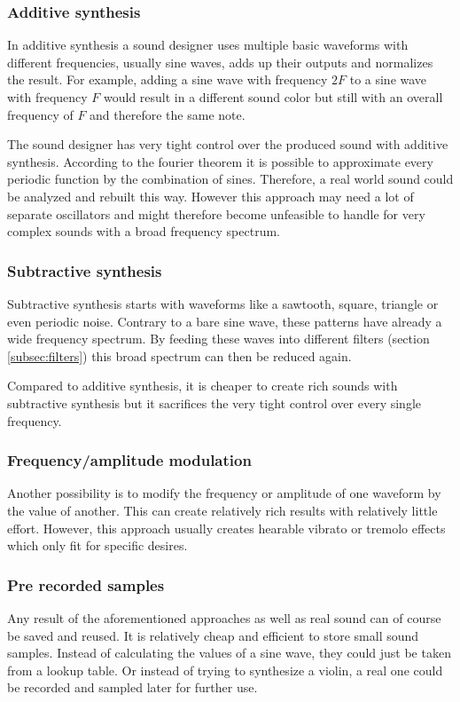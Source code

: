 			\subsubsection{Additive synthesis}
				In additive synthesis a sound designer uses multiple basic waveforms with different frequencies, usually sine waves, adds up their outputs and normalizes the result.
				For example, adding a sine wave with frequency $2F$ to a sine wave with frequency $F$ would result in a different sound color but still with an overall frequency of $F$ and therefore the same note.
				
				The sound designer has very tight control over the produced sound with additive synthesis.
				According to the fourier theorem it is possible to approximate every periodic function by the combination of sines. 
				Therefore, a real world sound could be analyzed and rebuilt this way.
				However this approach may need a lot of separate oscillators and might therefore become unfeasible to handle for very complex sounds with a broad frequency spectrum.
			\subsubsection{Subtractive synthesis}
				Subtractive synthesis starts with waveforms like a sawtooth, square, triangle or even periodic noise.
				Contrary to a bare sine wave, these patterns have already a wide frequency spectrum. 
				By feeding these waves into different filters (section \ref{subsec:filters}) this broad spectrum can then be reduced again. 
				
				Compared to additive synthesis, it is cheaper to create rich sounds with subtractive synthesis but it sacrifices the very tight control over every single frequency.
			\subsubsection{Frequency/amplitude modulation}
				Another possibility is to modify the frequency or amplitude of one waveform by the value of another.
				This can create relatively rich results with relatively little effort.
				However, this approach usually creates hearable vibrato or tremolo effects which only fit for specific desires.
			\subsubsection{Pre recorded samples}
				Any result of the aforementioned approaches as well as real sound can of course be saved and reused.
				It is relatively cheap and efficient to store small sound samples. 
				Instead of calculating the values of a sine wave, they could just be taken from a lookup table.
				Or instead of trying to synthesize a violin, a real one could be recorded and sampled later for further use.
				
